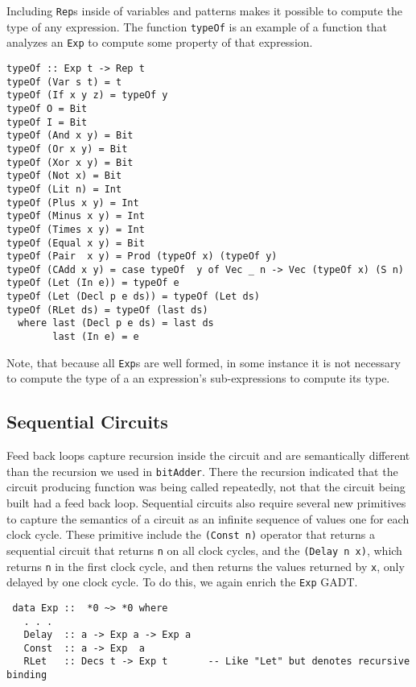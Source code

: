 \documentclass[10pt,twoside]{article}
\begin{document}
Including {\tt Rep}s inside of variables and patterns makes it possible
to compute the type of any expression. The function {\tt typeOf} is
an example of a function that analyzes an {\tt Exp} to compute some
property of that expression.

\begin{verbatim}
typeOf :: Exp t -> Rep t
typeOf (Var s t) = t
typeOf (If x y z) = typeOf y
typeOf O = Bit
typeOf I = Bit
typeOf (And x y) = Bit
typeOf (Or x y) = Bit
typeOf (Xor x y) = Bit
typeOf (Not x) = Bit
typeOf (Lit n) = Int
typeOf (Plus x y) = Int
typeOf (Minus x y) = Int
typeOf (Times x y) = Int
typeOf (Equal x y) = Bit
typeOf (Pair  x y) = Prod (typeOf x) (typeOf y)
typeOf (CAdd x y) = case typeOf  y of Vec _ n -> Vec (typeOf x) (S n)
typeOf (Let (In e)) = typeOf e 
typeOf (Let (Decl p e ds)) = typeOf (Let ds) 
typeOf (RLet ds) = typeOf (last ds)
  where last (Decl p e ds) = last ds
        last (In e) = e
\end{verbatim}

Note, that because all {\tt Exp}s are well formed, in some instance
it is not necessary to compute the type of a an expression's
sub-expressions to compute its type.

\subsection{Sequential Circuits}

Feed back loops capture recursion inside the circuit and are semantically
different than the recursion we used in {\tt bitAdder}. There the recursion
indicated that the circuit producing function was being called repeatedly,
not that the circuit being built had a feed back loop. Sequential circuits
also require several new primitives to capture the semantics of a circuit as
an infinite sequence of values one for each clock cycle. These primitive
include the {\tt (Const n)} operator that returns a sequential circuit that
returns {\tt n} on all clock cycles, and the {\tt (Delay n x)}, which returns
{\tt n} in the first clock cycle, and then returns the values returned by {\tt x},
only delayed by one clock cycle. To do this, we again enrich the {\tt Exp}
GADT.

\begin{verbatim}
 data Exp ::  *0 ~> *0 where
   . . .
   Delay  :: a -> Exp a -> Exp a
   Const  :: a -> Exp  a
   RLet   :: Decs t -> Exp t       -- Like "Let" but denotes recursive binding
\end{verbatim}
\end{document}
